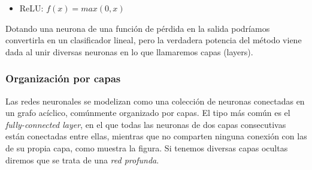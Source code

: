 \documentclass[12,twoside]{TFG-GM}
\makeatletter
\theoremstyle{definition}
\theoremstyle{remark}
\def\tikzscale{1}\begin{lrbox}{\measure@tikzpicture}%
\edef\tikzscale{\pgfmathresult}%
\makeatother
\begin{document}
\begin{itemize}
\item ReLU: $f(x)=max(0,x)$

\begin{figure}[H]
\centering
\begin{scaletikzpicturetowidth}{0.5\textwidth}
\end{scaletikzpicturetowidth}
\end{figure}
\end{itemize}

%

Dotando una neurona de una función de pérdida en la salida podríamos convertirla en un clasificador lineal, pero la verdadera potencia del método viene dada al unir diversas neuronas en lo que llamaremos capas (layers).

\subsubsection{Organización por capas}
Las redes neuronales se modelizan como una colección de neuronas conectadas en un grafo acíclico, comúnmente organizado por capas. El tipo más común es el \textit{fully-connected layer}, en el que todas las neuronas de dos capas consecutivas están conectadas entre ellas, mientras que no comparten ninguna conexión con las de su propia capa, como muestra la figura. Si tenemos diversas capas ocultas diremos que se trata de una \textit{red profunda}.
\end{document}

